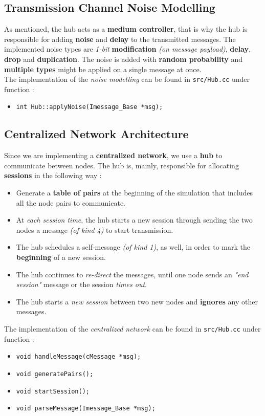 \subsection{Transmission Channel Noise Modelling}
As mentioned, the hub acts as a \textbf{medium controller}, that is why the hub is responsible for adding \textbf{noise} and \textbf{delay} to the transmitted messages. The implemented noise types are \emph{1-bit} \textbf{modification} \emph{(on message payload)}, \textbf{delay}, \textbf{drop} and \textbf{duplication}. The noise is added with \textbf{random probability} and \textbf{multiple types} might be applied on a single message at once. \\

The implementation of the \emph{noise modelling} can be found in \texttt{src/Hub.cc} under function :
\begin{itemize}
    \item \texttt{int Hub::applyNoise(Imessage\_Base *msg);}
\end{itemize}

\subsection{Centralized Network Architecture}
Since we are implementing a \textbf{centralized network}, we use a \textbf{hub} to communicate between nodes. The hub is, mainly, responsible for allocating \textbf{sessions} in the following way :
\begin{itemize}
    \item Generate a \textbf{table of pairs} at the beginning of the simulation that includes all the node pairs to communicate.
    \item At \emph{each session time}, the hub starts a new session through sending the two nodes a message \emph{(of kind 4)} to start transmission.
    \item The hub schedules a self-message \emph{(of kind 1)}, as well, in order to mark the \textbf{beginning} of a new session.
    \item The hub continues to \emph{re-direct} the messages, until one node sends an \textit{"end session"} message or the session \emph{times out}.
    \item The hub starts a \emph{new session} between two new nodes and \textbf{ignores} any other messages.
\end{itemize}

The implementation of the \emph{centralized network} can be found in \texttt{src/Hub.cc} under function :
\begin{itemize}
    \item \texttt{void handleMessage(cMessage *msg);}
    \item \texttt{void generatePairs();}
    \item \texttt{void startSession();}
    \item \texttt{void parseMessage(Imessage\_Base *msg);}
\end{itemize}

